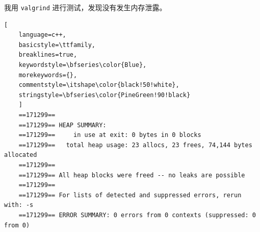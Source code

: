\documentclass[UTF8]{ctexart}
\begin{document}
我用 \texttt{valgrind} 进行测试，发现没有发生内存泄露。
\begin{lstlisting}[ 
    language=c++,
    basicstyle=\ttfamily,
    breaklines=true,
    keywordstyle=\bfseries\color{Blue}, 
    morekeywords={}, 
    commentstyle=\itshape\color{black!50!white},
    stringstyle=\bfseries\color{PineGreen!90!black} 
    ]
    ==171299== 
    ==171299== HEAP SUMMARY:
    ==171299==     in use at exit: 0 bytes in 0 blocks
    ==171299==   total heap usage: 23 allocs, 23 frees, 74,144 bytes allocated
    ==171299== 
    ==171299== All heap blocks were freed -- no leaks are possible
    ==171299== 
    ==171299== For lists of detected and suppressed errors, rerun with: -s
    ==171299== ERROR SUMMARY: 0 errors from 0 contexts (suppressed: 0 from 0)
\end{lstlisting}
\end{document}
